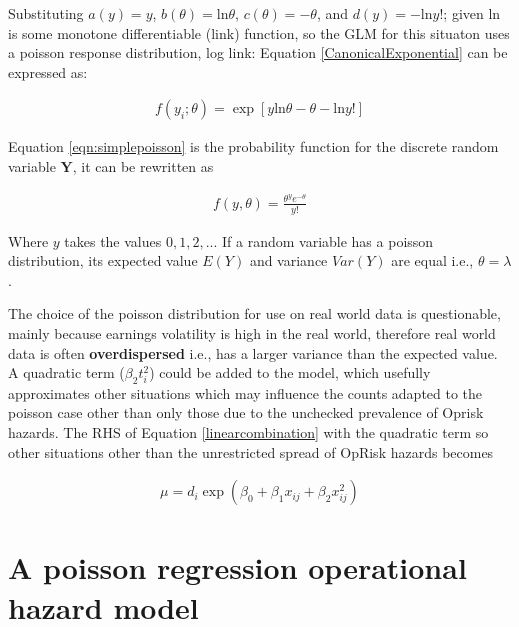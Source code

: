 \documentclass{DissertateUSU}
\begin{document}
Substituting \(a(y)=y\), \(b(\theta) = \mbox{ln}\theta\),
\(c(\theta) = -\theta\), and \(d(y) = -\mbox{ln}y!\); given
\(\mbox{ln}\) is some monotone differentiable (link) function, so the
GLM for this situaton uses a poisson response distribution, log link:
Equation \ref{CanonicalExponential} can be expressed as:

\singlespacing

\begin{eqnarray}\label{eqn:simplepoisson}
f(y_i;\theta) = \exp{\left[y\mbox{ln}\theta - \theta -\mbox{ln}y!\right]}
\end{eqnarray} \doublespacing

Equation \ref{eqn:simplepoisson} is the probability function for the
discrete random variable \(\mathbf{Y}\), it can be rewritten as

\singlespacing

\begin{eqnarray}\label{POISSON}
f(y,\theta) = \frac{\theta^ye^{-\theta}}{y!}
\end{eqnarray} \doublespacing

Where \(y\) takes the values \(0,1,2,..\). If a random variable has a
poisson distribution, its expected value \(E(Y)\) and variance
\(Var(Y)\) are equal i.e., \(\theta =\lambda\).\medskip

The choice of the poisson distribution for use on real world data is
questionable, mainly because earnings volatility is high in the real
world, therefore real world data is often \textbf{overdispersed} i.e.,
has a larger variance than the expected value. A quadratic term
(\(\beta_2t_i^2\)) could be added to the model, which usefully
approximates other situations which may influence the counts adapted to
the poisson case other than only those due to the unchecked prevalence
of Oprisk hazards. The RHS of Equation \ref{linearcombination} with the
quadratic term so other situations other than the unrestricted spread of
OpRisk hazards becomes

\singlespacing

\begin{eqnarray}\label{eqn:adaptedpoisson}
\mu = d_i\exp{(\beta_0 + \beta_1x_{ij} + \beta_2x_{ij}^2)} 
\end{eqnarray} \doublespacing

\section{A poisson regression operational hazard model}
\label{sec:A poisson regression operational hazard model}
\end{document}
